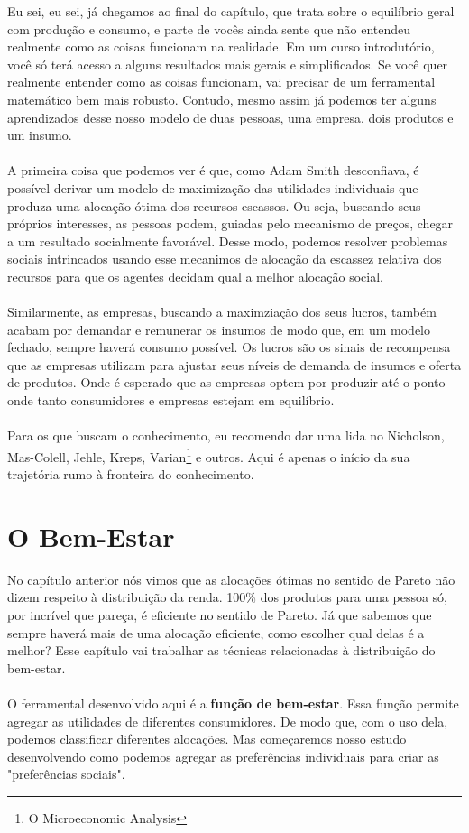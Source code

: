 \documentclass[a4paper,11pt,oneside]{book}
\theoremstyle{definition}
\theoremstyle{break}
\begin{document}
Eu sei, eu sei, já chegamos ao final do capítulo, que trata sobre o equilíbrio geral com produção e consumo, e parte de vocês ainda sente que não entendeu realmente como as coisas funcionam na realidade. Em um curso introdutório, você só terá acesso a alguns resultados mais gerais e simplificados. Se você quer realmente entender como as coisas funcionam, vai precisar de um ferramental matemático bem mais robusto. Contudo, mesmo assim já podemos ter alguns aprendizados desse nosso modelo de duas pessoas, uma empresa, dois produtos e um insumo.
\\~\\
A primeira coisa que podemos ver é que, como Adam Smith desconfiava, é possível derivar um modelo de maximização das utilidades individuais que produza uma alocação ótima dos recursos escassos. Ou seja, buscando seus próprios interesses, as pessoas podem, guiadas pelo mecanismo de preços, chegar a um resultado socialmente favorável. Desse modo, podemos resolver problemas sociais intrincados usando esse mecanimos de alocação da escassez relativa dos recursos para que os agentes decidam qual a melhor alocação social.
\\~\\
Similarmente, as empresas, buscando a maximziação dos seus lucros, também acabam por demandar e remunerar os insumos de modo que, em um modelo fechado, sempre haverá consumo possível. Os lucros são os sinais de recompensa que as empresas utilizam para ajustar seus níveis de demanda de insumos e oferta de produtos. Onde é esperado que as empresas optem por produzir até o ponto onde tanto consumidores e empresas estejam em equilíbrio.
\\~\\
Para os que buscam o conhecimento, eu recomendo dar uma lida no Nicholson, Mas-Colell, Jehle, Kreps, Varian\footnote{O Microeconomic Analysis} e outros. Aqui é apenas o início da sua trajetória rumo à fronteira do conhecimento.


\chapter{O Bem-Estar}

No capítulo anterior nós vimos que as alocações ótimas no sentido de Pareto não dizem respeito à distribuição da renda. 100\% dos produtos para uma pessoa só, por incrível que pareça, é eficiente no sentido de Pareto. Já que sabemos que sempre haverá mais de uma alocação eficiente, como escolher qual delas é a melhor? Esse capítulo vai trabalhar as técnicas relacionadas à distribuição do bem-estar.
\\~\\
O ferramental desenvolvido aqui é a \textbf{função de bem-estar}. Essa função permite agregar as utilidades de diferentes consumidores. De modo que, com o uso dela, podemos classificar diferentes alocações. Mas começaremos nosso estudo desenvolvendo como podemos agregar as preferências individuais para criar as "preferências sociais".
\end{document}
